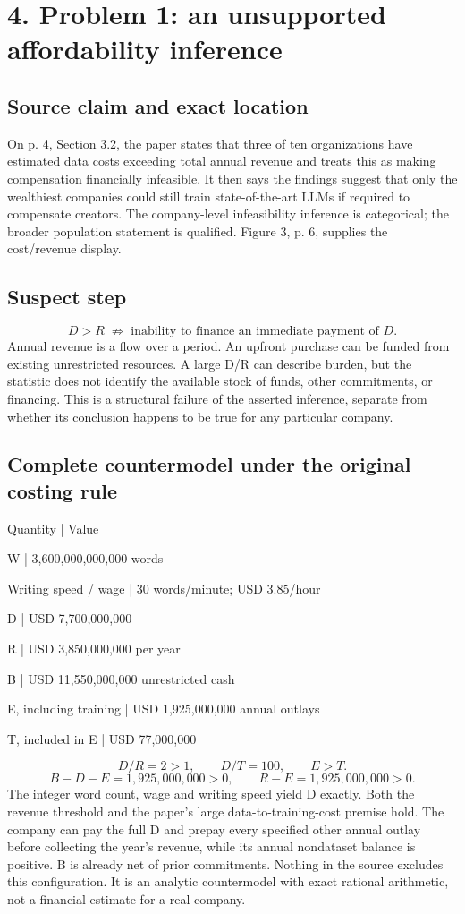 \documentclass[10pt]{article}
\begin{document}
\section*{4. Problem 1: an unsupported affordability inference}
\subsection*{Source claim and exact location}
On p. 4, Section 3.2, the paper states that three of ten organizations have estimated data costs exceeding total annual revenue and treats this as making compensation financially infeasible. It then says the findings suggest that only the wealthiest companies could still train state-of-the-art LLMs if required to compensate creators. The company-level infeasibility inference is categorical; the broader population statement is qualified. Figure 3, p. 6, supplies the cost/revenue display.\par
\subsection*{Suspect step}
\[D>R\;\not\Rightarrow\;\text{inability to finance an immediate payment of }D.\] Annual revenue is a flow over a period. An upfront purchase can be funded from existing unrestricted resources. A large D/R can describe burden, but the statistic does not identify the available stock of funds, other commitments, or financing. This is a structural failure of the asserted inference, separate from whether its conclusion happens to be true for any particular company.\par
\subsection*{Complete countermodel under the original costing rule}
Quantity | Value\par
W | 3,600,000,000,000 words\par
Writing speed / wage | 30 words/minute; USD 3.85/hour\par
D | USD 7,700,000,000\par
R | USD 3,850,000,000 per year\par
B | USD 11,550,000,000 unrestricted cash\par
E, including training | USD 1,925,000,000 annual outlays\par
T, included in E | USD 77,000,000\par
\[D/R=2>1,\qquad D/T=100,\qquad E>T.\] \[B-D-E=1{,}925{,}000{,}000>0,\qquad R-E=1{,}925{,}000{,}000>0.\] The integer word count, wage and writing speed yield D exactly. Both the revenue threshold and the paper’s large data-to-training-cost premise hold. The company can pay the full D and prepay every specified other annual outlay before collecting the year’s revenue, while its annual nondataset balance is positive. B is already net of prior commitments. Nothing in the source excludes this configuration. It is an analytic countermodel with exact rational arithmetic, not a financial estimate for a real company.\par
\end{document}
